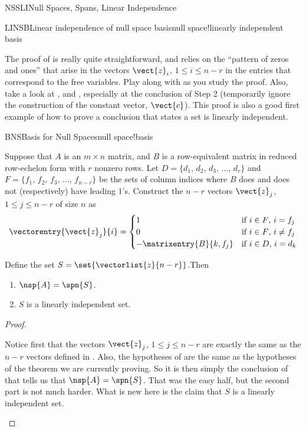\begin{subsect}{NSSLI}{Null Spaces, Spans, Linear Independence}
\begin{example}{LINSB}{Linear independence of null space basis}{null space!linearly independent basis}
%
\end{example}
%
\begin{para}The proof of  is really quite straightforward, and relies on the ``pattern of zeros and ones'' that arise in the vectors $\vect{z}_i$, $1\leq i\leq n-r$ in the entries that correspond to the free variables.  Play along with  as you study the proof.   Also, take a look at ,  and , especially at the conclusion of Step 2 (temporarily ignore the construction of the constant vector, $\vect{c}$).  This proof is also a good first example of how to prove a conclusion that states a set is linearly independent.
\end{para}
%
\begin{theorem}{BNS}{Basis for Null Spaces}{null space!basis}
\begin{para}Suppose that $A$ is an $m\times n$ matrix, and $B$ is a row-equivalent matrix in reduced row-echelon form with $r$ nonzero rows.  Let $D=\{d_1,\,d_2,\,d_3,\,\ldots,\,d_r\}$ and $F=\{f_1,\,f_2,\,f_3,\,\ldots,\,f_{n-r}\}$ be the sets of column indices where $B$ does and does not (respectively) have leading 1's.  Construct the $n-r$ vectors $\vect{z}_j$, $1\leq j\leq n-r$ of size $n$ as
%
\begin{equation*}
\vectorentry{\vect{z}_j}{i}=
\begin{cases}
1&\text{if $i\in F$, $i=f_j$}\\
0&\text{if $i\in F$, $i\neq f_j$}\\
-\matrixentry{B}{k,f_j}&\text{if $i\in D$, $i=d_k$}
\end{cases}
\end{equation*}\end{para}
%
\begin{para}
%
Define the set $S=\set{\vectorlist{z}{n-r}}$.Then
%
\begin{enumerate}
\item $\nsp{A}=\spn{S}$.
\item $S$ is a linearly independent set.
\end{enumerate}\end{para}
%
\end{theorem}
%
\begin{proof}
\begin{para}Notice first that the vectors $\vect{z}_j$, $1\leq j\leq n-r$ are exactly the same as the $n-r$ vectors defined in .  Also, the hypotheses of  are the same as the hypotheses of the theorem we are currently proving.  So it is then simply the conclusion of  that tells us that $\nsp{A}=\spn{S}$.  That was the easy half, but the second part is not much harder.  What is new here is the claim that $S$ is a linearly independent set.\end{para}

\end{proof}
\end{subsect}

